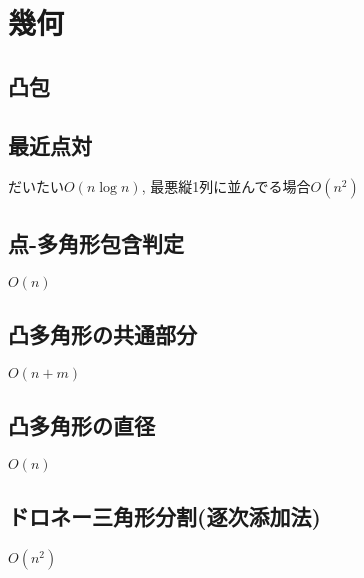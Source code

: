 \section{幾何}

\subsection{凸包}

\subsection{最近点対}
だいたい$O(n\log n)$, 最悪縦1列に並んでる場合$O(n^2)$

\subsection{点-多角形包含判定}
$O(n)$

\subsection{凸多角形の共通部分}
$O(n+m)$

\subsection{凸多角形の直径}
$O(n)$

\subsection{ドロネー三角形分割(逐次添加法)}
$O(n^2)$


